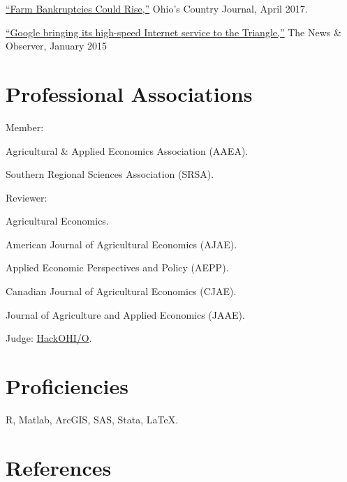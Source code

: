 \documentclass[letterpaper]{article}
\renewenvironment{itemize}{
  \begin{list}{}{
    \setlength{\leftmargin}{1.5em}
  }
}{
  \end{list}
}
\begin{document}
\begin{itemize}
\item \href{http://ocj.com/2017/04/farm-bankruptcies-could-rise/}{``Farm Bankruptcies Could Rise,''} Ohio's Country Journal, April 2017.
\item \href{http://www.newsobserver.com/news/local/community/cary-news/article10235465.html}{``Google bringing its high-speed Internet service to the Triangle,''} The News \& Observer, January 2015
\end{itemize}

\section*{Professional Associations}

\begin{itemize}
\item Member:
  \begin{itemize}
  \item Agricultural \& Applied Economics Association (AAEA).
  \item Southern Regional Sciences Association (SRSA).
  \end{itemize}
\item Reviewer:
  \begin{itemize}
  \item Agricultural Economics.
  \item American Journal of Agricultural Economics (AJAE).
  \item Applied Economic Perspectives and Policy (AEPP).
  \item Canadian Journal of Agricultural Economics (CJAE).
  \item Journal of Agriculture and Applied Economics (JAAE).
  \end{itemize}
\item Judge: \href{http://hack.osu.edu/2016/}{HackOHI/O}.
\end{itemize}


\section*{Proficiencies}

\begin{itemize}
\item R, Matlab, ArcGIS, SAS, Stata, \LaTeX.
\end{itemize}

\newpage

\section*{References}
\end{document}
